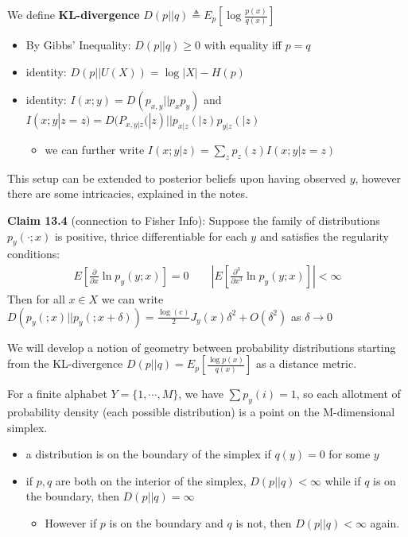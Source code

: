 \documentclass[12pt]{article} %
\begin{document}
We define \textbf{KL-divergence} $D(p||q) \triangleq E_p[\log \frac{p(x)}{q(x)}]$
\begin{itemize}[topsep=-1pt, itemsep=-1pt]
    \item By Gibbs' Inequality: $D(p||q) \geq 0$ with equality iff $p = q$
    \item identity: $D(p || U(X)) = \log |X| - H(p)$
    \item identity: $I(x;y) = D(p_{x,y} || p_x p_y)$ and $I(x;y|z = z) = D(P_{x,y|z}(|z) || p_{x|z}(|z) p_{y|z}(|z)$
    \begin{itemize}[topsep=-1pt, itemsep=-1pt]
        \item we can further write $I(x;y|z) = \sum_z p_z(z) I(x;y|z = z)$
    \end{itemize}
\end{itemize}
This setup can be extended to posterior beliefs upon having observed $y$, however there are some intricacies, explained in the notes.

\textbf{Claim 13.4} (connection to Fisher Info): Suppose the family of distributions $p_y(\cdot;x)$ is positive, thrice differentiable for each $y$ and satisfies the regularity conditions:
\begin{align*}
    E\left[\frac{\partial}{\partial x} \ln p_y(y;x)\right] = 0
    \qquad
    \left|
    E\left[\frac{\partial^3}{\partial x^3} \ln p_y(y;x)\right]
    \right| < \infty
\end{align*}
Then for all $x \in X$ we can write $D(p_y(;x)||p_y(;x+ \delta)) = \frac{\log(e)}{2} J_y(x)\delta^2 + O(\delta^2)$ as $\delta \rightarrow 0$


\newpage
{}
We will develop a notion of geometry between probability distributions starting from the KL-divergence $D(p||q) = E_p[\frac{\log p(x)}{q(x)}]$ as a distance metric.

For a finite alphabet $Y = \{1, \cdots, M\}$, we have $\sum p_y(i) = 1$, so each allotment of probability density (each possible distribution) is a point on the M-dimensional simplex.
\begin{itemize}[topsep=-1pt, itemsep=-1pt]
    \item a distribution is on the boundary of the simplex if $q(y) = 0$ for some $y$
    \item if $p,q$ are both on the interior of the simplex, $D(p||q) < \infty$ while if $q$ is on the boundary, then $D(p||q) = \infty$
    \begin{itemize}[topsep=-1pt, itemsep=-1pt]
        \item However if $p$ is on the boundary and $q$ is not, then $D(p||q) < \infty$ again.
    \end{itemize}
\end{itemize}
\end{document}
